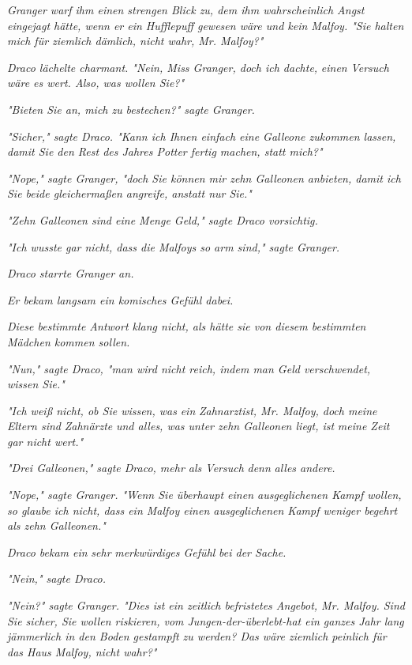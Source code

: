 {\emph{Granger warf ihm einen strengen Blick zu, dem ihm wahrscheinlich Angst eingejagt hätte, wenn er ein Hufflepuff gewesen wäre und kein Malfoy. "Sie halten mich für ziemlich dämlich, nicht wahr, Mr. Malfoy?"}

\emph{Draco lächelte charmant. "Nein, Miss Granger, doch ich dachte,} \emph{einen} \emph{\emph{Versuch}} \emph{wäre es wert. Also, was wollen Sie?"}

\emph{"Bieten Sie an, mich zu} \emph{\emph{bestechen?}" sagte Granger.}

\emph{"Sicher," sagte Draco. "Kann ich Ihnen einfach eine Galleone zukommen lassen, damit Sie den Rest des Jahres Potter fertig machen, statt mich?"}

\emph{"Nope," sagte Granger, "doch Sie können mir zehn Galleonen anbieten, damit ich Sie beide gleichermaßen angreife, anstatt nur Sie."}

\emph{"Zehn Galleonen sind eine Menge Geld," sagte Draco vorsichtig.}

\emph{"Ich wusste gar nicht, dass die Malfoys so arm sind," sagte Granger.}

\emph{Draco starrte Granger an.}

\emph{Er bekam langsam ein komisches Gefühl dabei.}

\emph{Diese bestimmte Antwort klang nicht, als hätte sie von diesem bestimmten Mädchen kommen sollen.}

\emph{"Nun," sagte Draco, "man wird nicht reich, indem man Geld verschwendet, wissen Sie."}

\emph{"Ich weiß nicht, ob Sie wissen, was} \emph{ein} \emph{Zahnarztist, Mr. Malfoy, doch meine Eltern sind} \emph{\emph{Zahnärzte}} \emph{und alles, was unter zehn Galleonen liegt, ist} \emph{meine Zeit gar nicht wert."}

\emph{"Drei Galleonen," sagte Draco, mehr als Versuch} \emph{denn} \emph{alles andere.}

\emph{"Nope," sagte Granger. "Wenn Sie überhaupt einen ausgeglichenen Kampf wollen, so glaube ich nicht, dass ein Malfoy einen ausgeglichenen Kampf weniger begehrt als zehn Galleonen."}

\emph{Draco bekam ein} \emph{\emph{sehr}} \emph{merkwürdiges Gefühl} \emph{bei der Sache.}

\emph{"Nein," sagte Draco.}

\emph{"Nein?" sagte Granger. "Dies ist ein zeitlich befristetes Angebot, Mr. Malfoy. Sind Sie sicher, Sie wollen riskieren, vom Jungen-der-überlebt-hat ein ganzes Jahr lang jämmerlich in den Boden gestampft zu werden? Das wäre ziemlich peinlich für das Haus Malfoy, nicht wahr?"}

}
